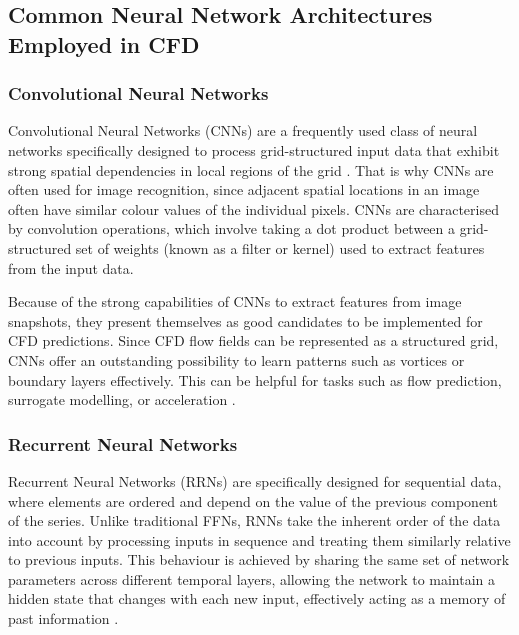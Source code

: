 \subsection{Common Neural Network Architectures Employed in CFD}
\label{subsect: commonNN}

\subsubsection{Convolutional Neural Networks}
Convolutional Neural Networks (CNNs) are a frequently used class of neural networks specifically designed to process grid-structured input data that exhibit strong spatial dependencies in local regions of
the grid \cite{Aggarwal2018}. That is why CNNs are often used for image recognition, since adjacent spatial locations in an image often have similar colour values of the individual pixels. CNNs are characterised by convolution operations, which involve taking a dot product between a grid-structured set of weights (known as a filter or kernel) used to extract features from the input data.

Because of the strong capabilities of CNNs to extract features from image snapshots, they present
themselves as good candidates to be implemented for CFD predictions. Since CFD flow fields can
be represented as a structured grid, CNNs offer an outstanding possibility to learn patterns such as
vortices or boundary layers effectively. This can be helpful for tasks such as flow prediction, surrogate modelling, or acceleration \cite{Lee_You_2019, Guo2016}.


\subsubsection{Recurrent Neural Networks}

Recurrent Neural Networks (RRNs) are specifically designed for sequential data, where elements are ordered and depend on the value of the previous component of the series. Unlike traditional FFNs, RNNs take the inherent order of the data into account by processing inputs in sequence and treating them similarly relative to previous inputs. This behaviour is achieved by sharing the same set of network parameters across different temporal layers, allowing the network to maintain a hidden state that changes with each new input, effectively acting as a memory of past information \cite{Aggarwal2018}. 

